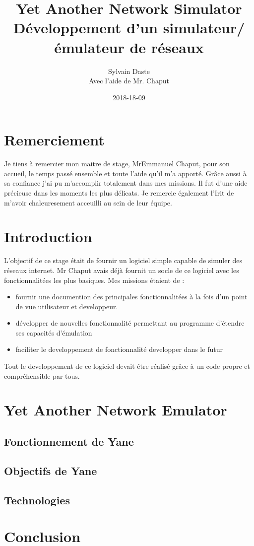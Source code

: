 \documentclass{article}
\begin{document}
	\title{Yet Another Network Simulator Développement d'un simulateur/émulateur de réseaux}
	\date{2018-18-09}
	\author{Sylvain Daste\\Avec l'aide de Mr. Chaput}
	
	\maketitle
  	\newpage
	\tableofcontents
  	\newpage
	\section{Remerciement}
Je tiens à remercier mon maitre de stage, MrEmmanuel Chaput, pour son accueil, le temps passé ensemble et toute l'aide qu'il m'a apporté. Grâce aussi à sa confiance j'ai pu m'accomplir totalement dans mes missions. Il fut d'une aide précieuse dans les moments les plus délicats. Je remercie également l'Irit de m'avoir chaleuresement acceuilli au sein de leur équipe.

	\newpage
	\section{Introduction}
L'objectif de ce stage était de fournir un logiciel simple capable de simuler des réseaux internet. Mr Chaput avais déjà fournit un socle de ce logiciel avec les fonctionnalitées les plus basiques. Mes missions étaient de :
\begin{itemize}
\item fournir une documention des principales fonctionnalitées à la fois d'un point de vue utilisateur et developpeur.
\item développer de nouvelles fonctionnalité permettant au programme d'étendre ses capacités d'émulation
\item faciliter le developpement de fonctionnalité developper dans le futur
\end{itemize}
Tout le developpement de ce logiciel devait être réalisé grâce à un code propre et compréhensible par tous. 
	\newpage	
	\section{Yet Another Network Emulator}
		\subsection{Fonctionnement de Yane}
		\subsection{Objectifs de Yane}
		\subsection{Technologies}
		\newpage
	\section{Conclusion}
\end{document}

